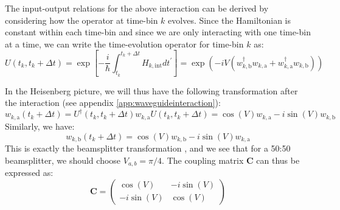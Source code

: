 The input-output relations for the above interaction can be derived by considering how the operator at time-bin $k$ evolves. Since the Hamiltonian is constant within each time-bin and since we are only interacting with one time-bin at a time, we can write the time-evolution operator for time-bin $k$ as:
\begin{equation}
    U(t_k,t_k+\Delta t) =\exp \left[-\frac{i}{\hbar} \int_{t_k}^{t_k+\Delta t} H_{k,\mathrm{int}} d t^{\prime}\right] = \exp(- i V(w_{k,\mathrm{b}}^\dagger w_{k,\mathrm{a}} + w_{k,\mathrm{a}}^\dagger w_{k,\mathrm{b}} ))
\end{equation}

In the Heisenberg picture, we will thus have the following transformation after the interaction (see appendix \ref{app:waveguideinteraction}):
\begin{equation}
w_{k,\mathrm{a}}(t_k + \Delta t) = U^\dagger(t_k,t_k+\Delta t) w_{k,\mathrm{a}} U(t_k,t_k+\Delta t) = \cos(V) w_{k,\mathrm{a}} - i \sin(V) w_{k,\mathrm{b}}
\end{equation}
Similarly, we have:
\begin{equation}
w_{k,\mathrm{b}}(t_k + \Delta t) = \cos(V) w_{k,\mathrm{b}} - i \sin(V) w_{k,\mathrm{a}}
\end{equation}
This is exactly the beamsplitter transformation \cite{Gerry2004IntroductoryOptics}, and we see that for a 50:50 beamsplitter, we should choose $V_{a,b} = \pi/4$.  The coupling matrix $\mathbf{C}$ can thus be expressed as:
\begin{equation}
    \mathbf{C} = \begin{pmatrix}
        \cos(V) & -i \sin(V) \\
        -i \sin(V) & \cos(V)
    \end{pmatrix} \label{eq:C_timebin}
\end{equation}
